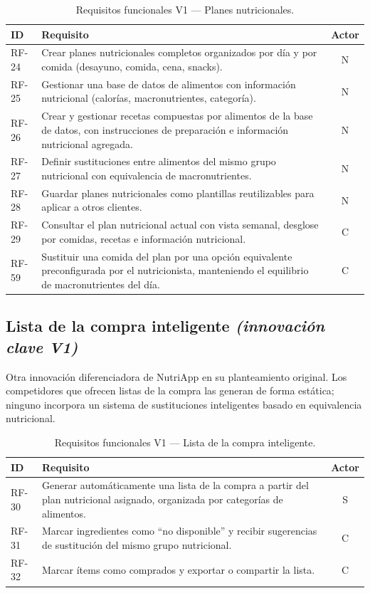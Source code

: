 \begin{table}[!ht]
\centering
\small
\begin{tabular}{|l|p{10.5cm}|c|}
\hline
\textbf{ID} & \textbf{Requisito} & \textbf{Actor} \\
\hline
RF-24 & Crear planes nutricionales completos organizados por día y por comida (desayuno, comida, cena, snacks). & N \\
\hline
RF-25 & Gestionar una base de datos de alimentos con información nutricional (calorías, macronutrientes, categoría). & N \\
\hline
RF-26 & Crear y gestionar recetas compuestas por alimentos de la base de datos, con instrucciones de preparación e información nutricional agregada. & N \\
\hline
RF-27 & Definir sustituciones entre alimentos del mismo grupo nutricional con equivalencia de macronutrientes. & N \\
\hline
RF-28 & Guardar planes nutricionales como plantillas reutilizables para aplicar a otros clientes. & N \\
\hline
RF-29 & Consultar el plan nutricional actual con vista semanal, desglose por comidas, recetas e información nutricional. & C \\
\hline
RF-59 & Sustituir una comida del plan por una opción equivalente preconfigurada por el nutricionista, manteniendo el equilibrio de macronutrientes del día. & C \\
\hline
\end{tabular}
\caption{Requisitos funcionales V1 --- Planes nutricionales.}
\label{tab:rf-planes-v1}
\end{table}

\subsection{Lista de la compra inteligente \textnormal{\textit{(innovación clave V1)}}}

Otra innovación diferenciadora de NutriApp en su planteamiento original. Los competidores que ofrecen listas de la compra las generan de forma estática; ninguno incorpora un sistema de sustituciones inteligentes basado en equivalencia nutricional.

\begin{table}[htbp]
\centering
\small
\begin{tabular}{|l|p{10.5cm}|c|}
\hline
\textbf{ID} & \textbf{Requisito} & \textbf{Actor} \\
\hline
RF-30 & Generar automáticamente una lista de la compra a partir del plan nutricional asignado, organizada por categorías de alimentos. & S \\
\hline
RF-31 & Marcar ingredientes como ``no disponible'' y recibir sugerencias de sustitución del mismo grupo nutricional. & C \\
\hline
RF-32 & Marcar ítems como comprados y exportar o compartir la lista. & C \\
\hline
\end{tabular}
\caption{Requisitos funcionales V1 --- Lista de la compra inteligente.}
\label{tab:rf-lista-v1}
\end{table}

